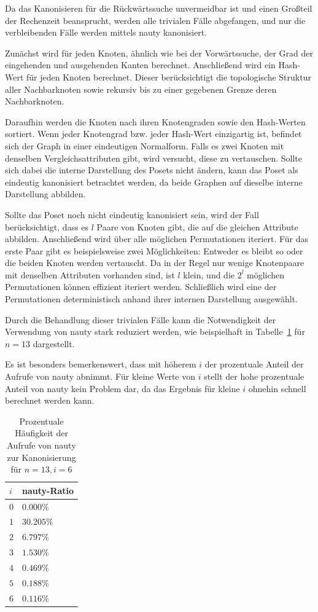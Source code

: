 \documentclass[10pt,journal,compsoc]{IEEEtran}
\begin{document}
Da das Kanonisieren für die Rückwärtssuche unvermeidbar ist und einen Großteil der Rechenzeit beansprucht, werden alle trivialen Fälle abgefangen, und nur die verbleibenden Fälle werden mittels nauty kanonisiert.

Zunächst wird für jeden Knoten, ähnlich wie bei der Vorwärtssuche, der Grad der eingehenden und ausgehenden Kanten berechnet.
Anschließend wird ein Hash-Wert für jeden Knoten berechnet.
Dieser berücksichtigt die topologische Struktur aller Nachbarknoten sowie rekursiv bis zu einer gegebenen Grenze deren Nachbarknoten.

Daraufhin werden die Knoten nach ihren Knotengraden sowie den Hash-Werten sortiert.
Wenn jeder Knotengrad bzw. jeder Hash-Wert einzigartig ist, befindet sich der Graph in einer eindeutigen Normalform.
Falls es zwei Knoten mit denselben Vergleichsattributen gibt, wird versucht, diese zu vertauschen.
Sollte sich dabei die interne Darstellung des Posets nicht ändern, kann das Poset als eindeutig kanonisiert betrachtet werden, da beide Graphen auf dieselbe interne Darstellung abbilden.

Sollte das Poset noch nicht eindeutig kanonisiert sein, wird der Fall berücksichtigt, dass es $l$ Paare von Knoten gibt, die auf die gleichen Attribute abbilden.
Anschließend wird über alle möglichen Permutationen iteriert.
Für das erste Paar gibt es beispielsweise zwei Möglichkeiten: Entweder es bleibt so oder die beiden Knoten werden vertauscht.
Da in der Regel nur wenige Knotenpaare mit denselben Attributen vorhanden sind, ist $l$ klein, und die $2^l$ möglichen Permutationen können effizient iteriert werden. Schließlich wird eine der Permutationen deterministisch anhand ihrer internen Darstellung ausgewählt.

Durch die Behandlung dieser trivialen Fälle kann die Notwendigkeit der Verwendung von nauty stark reduziert werden, wie beispielhaft in Tabelle~\ref{table:nauty-ratio} für $n = 13$ dargestellt.

Es ist besonders bemerkenswert, dass mit höherem $i$ der prozentuale Anteil der Aufrufe von nauty abnimmt.
Für kleine Werte von $i$ stellt der hohe prozentuale Anteil von nauty kein Problem dar, da das Ergebnis für kleine $i$ ohnehin schnell berechnet werden kann.

\begin{table}
  \begin{tabular}{l|l}
    $i$ & nauty-Ratio \\
    \hline
    $0$ & $0.000\%$   \\
    $1$ & $30.205\%$  \\
    $2$ & $6.797\%$   \\
    $3$ & $1.530\%$   \\
    $4$ & $0.469\%$   \\
    $5$ & $0.188\%$   \\
    $6$ & $0.116\%$
  \end{tabular}
  \centering
  \caption{Prozentuale Häufigkeit der Aufrufe von nauty zur Kanonisierung für $n = 13, i = 6$}
  \label{table:nauty-ratio}
\end{table}
\end{document}
